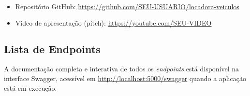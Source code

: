 \documentclass[12pt]{article}
\begin{document}
\begin{itemize}
  \item Repositório GitHub: \url{https://github.com/SEU-USUARIO/locadora-veiculos}
  \item Vídeo de apresentação (pitch): \url{https://youtube.com/SEU-VIDEO}
\end{itemize}

\subsection{Lista de Endpoints}

A documentação completa e interativa de todos os \emph{endpoints} está disponível na interface Swagger, acessível em \url{http://localhost:5000/swagger} quando a aplicação está em execução.
\end{document}

